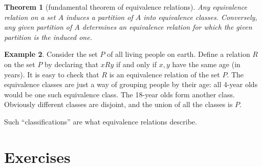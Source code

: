 \documentclass[11pt]{article}
\newtheorem{thm}{Theorem}[section]
\theoremstyle{definition}
\newtheorem{example}[thm]{Example}
\begin{document}
\begin{thm}[fundamental theorem of equivalence relations]
%
  Any equivalence relation on a set $A$ induces a partition of $A$
  into equivalence classes. Conversely, any given partition of $A$
  determines an equivalence relation for which the given partition is
  the induced one.
\end{thm}



\begin{example}
Consider the set $P$ of all living people on earth. Define a relation
$R$ on the set $P$ by declaring that $x R y$ if and only if $x,y$ have
the same age (in years).  It is easy to check that $R$ is an
equivalence relation of the set $P$. The equivalence classes are just
a way of grouping people by their age: all 4-year olds would be one
such equivalence class. The 18-year olds form another class. Obviously
different classes are disjoint, and the union of all the classes is
$P$.

Such ``classifications'' are what equivalence relations describe. 
\end{example}


\section*{Exercises}
\end{document}
